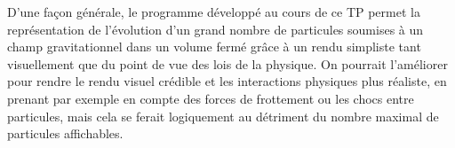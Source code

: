 D'une façon générale, le programme développé au cours de ce TP permet la représentation de l'évolution d'un grand nombre de particules soumises à un champ gravitationnel dans un volume fermé grâce à un rendu simpliste tant visuellement que du point de vue des lois de la physique.
On pourrait l'améliorer pour rendre le rendu visuel crédible et les interactions physiques plus réaliste, en prenant par exemple en compte des forces de frottement ou les chocs entre particules, mais cela se ferait logiquement au détriment du nombre maximal de particules affichables.